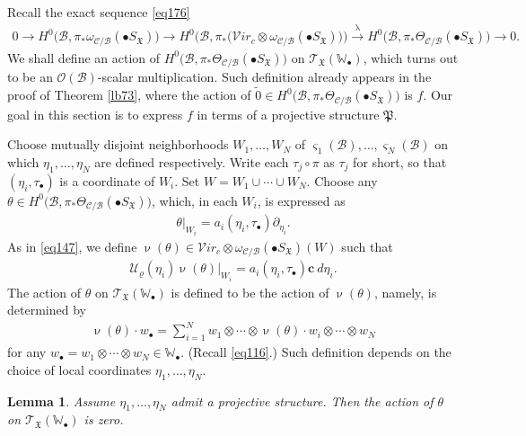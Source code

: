 \documentclass[12pt,b5paper,notitlepage]{report}
\theoremstyle{definition}
\theoremstyle{plain}
\newtheorem{lm}[df]{Lemma}
\newcommand{\fk}{\mathfrak}
\newcommand{\mc}{\mathcal}
\newcommand{\wtd}{\widetilde}
\newcommand{\scr}{\mathscr}
\newcommand{\sgm}{\varsigma}
\newcommand{\blt}{\bullet}
\newcommand{\Wbb}{\mathbb W}
\newcommand{\cbf}{\mathbf c}
\newcommand{\svir}{\mathcal V\!\mathit{ir}}
\numberwithin{equation}{section}
\begin{document}
Recall the exact sequence \eqref{eq176}
\begin{align*}
0\rightarrow H^0\big(\mc B,\pi_*\omega_{\mc C/\mc B}(\blt S_{\fk X})\big) \rightarrow  H^0\big(\mc B,\pi_*\big(\svir_c\otimes \omega_{\mc C/\mc B}(\blt S_{\fk X})\big)\big)\xrightarrow{\uplambda}  H^0\big(\mc B,\pi_*\Theta_{\mc C/\mc B}(\blt S_{\fk X})\big)\rightarrow 0.
\end{align*}
We shall define an action of $H^0\big(\mc B,\pi_*\Theta_{\mc C/\mc B}(\blt S_{\fk X})\big)$ on $\scr T_{\fk X}(\Wbb_\blt)$, which turns out to be an $\scr O(\mc B)$-scalar multiplication. Such definition already appears in the proof of Theorem \ref{lb73}, where the action of $\wtd 0\in H^0\big(\mc B,\pi_*\Theta_{\mc C/\mc B}(\blt S_{\fk X})\big)$ is $f$. Our goal in this section is to express $f$ in terms of a projective structure $\fk P$.

Choose mutually disjoint neighborhoods $W_1,\dots,W_N$ of $\sgm_1(\mc B),\dots,\sgm_N(\mc B)$ on which $\eta_1,\dots,\eta_N$ are defined respectively. Write each $\tau_j\circ\pi$ as $\tau_j$ for short, so that $(\eta_i,\tau_\blt)$ is a coordinate of $W_i$. Set $W=W_1\cup\cdots\cup W_N$. Choose any $\theta\in H^0\big(\mc B,\pi_*\Theta_{\mc C/\mc B}(\blt S_{\fk X})\big)$, which, in each $W_i$, is expressed as
\begin{align}
\theta|_{W_i}=a_i(\eta_i,\tau_\blt)\partial_{\eta_i}.\label{eq177}
\end{align}
As in \eqref{eq147}, we define $\upnu(\theta)\in \svir_c\otimes \omega_{\mc C/\mc B}(\blt S_{\fk X})(W)$ such that
\begin{align}
\mc U_\varrho(\eta_i)\upnu(\theta)|_{W_i}=a_i(\eta_i,\tau_\blt)\cbf~d{\eta_i}.\label{eq178}
\end{align}
The action of $\theta$ on $\scr T_{\fk X}(\Wbb_\blt)$ is defined to be the action of $\upnu(\theta)$, namely, is determined by
\begin{align}
\upnu(\theta)\cdot w_\blt=\sum_{i=1}^N w_1\otimes\cdots\otimes \upnu(\theta)\cdot w_i\otimes\cdots \otimes w_N
\end{align}
for any $w_\blt=w_1\otimes\cdots\otimes w_N\in\Wbb_\blt$. (Recall \eqref{eq116}.) Such definition depends on the choice of local coordinates $\eta_1,\dots,\eta_N$.



\begin{lm}\label{lb74}
Assume $\eta_1,\dots,\eta_N$ admit a projective structure. Then the action of $\theta$ on $\scr T_{\fk X}(\Wbb_\blt)$ is zero.
\end{lm}
\end{document}
